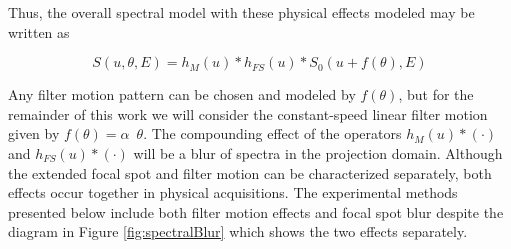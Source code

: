 \documentclass[]{spie}  %
\begin{document}
Thus, the overall spectral model with these physical effects modeled may be written as

\begin{equation}
	S(u,\theta,E) = h_M(u) * h_{FS}(u) * S_0 (u + f(\theta),E) 
\end{equation}

Any filter motion pattern can be chosen and modeled by $f(\theta)$, but for the remainder of this work we will consider the constant-speed linear filter motion given by $f(\theta) = \alpha \enspace\theta$. The compounding effect of the operators $h_M(u) * (\cdot{})$ and $h_{FS}(u) * (\cdot{})$ will be a blur of spectra in the projection domain. 
Although the extended focal spot and filter motion can be characterized separately, both effects occur together in physical acquisitions. The experimental methods presented below include both filter motion effects and focal spot blur despite the diagram in Figure \ref{fig:spectralBlur} which shows the two effects separately.




\end{document}
